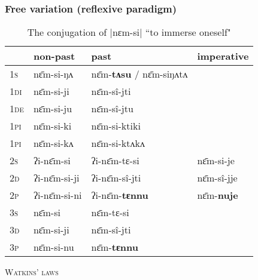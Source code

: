 \documentclass[xcolor=table]{beamer}
\newcommand{\ipa}[1]{{\phon \mbox{#1}}} %
\newcommand{\grise}[1]{\cellcolor{lightgray}\textbf{#1}}
\begin{document}
    
  \begin{frame} 
 \frametitle{Free variation (reflexive paradigm)} 
 

\begin{table}[h]
\caption{The conjugation of |\ipa{nɛm-si}|  ``to immerse oneself"  } \centering \label{tab:nyamsi}
\begin{tabular}{l|l|l|l}  
\toprule
& non-past & past & imperative\\
\midrule
\textsc{1s}  &  \ipa{nɛ̄m-si-ŋʌ}   &  \ipa{nɛ̄m-\textbf{tʌsu}} / \ipa{nɛ̄m-siŋʌtʌ}  \grise{}\\ 
\textsc{1di}  &  \ipa{nɛ̄m-si-ji}   &  \ipa{nɛ̄m-sî-jti} \\
\textsc{1de}  &  \ipa{nɛ̄m-si-ju}   &  \ipa{nɛ̄m-sî-jtu} \\ 
\textsc{1pi}  &  \ipa{nɛ̄m-si-ki}   &  \ipa{nɛ̄m-si-ktiki} \\ 
\textsc{1pi}  &  \ipa{nɛ̄m-si-kʌ}   &  \ipa{nɛ̄m-si-ktʌkʌ} \\ 
\midrule
\textsc{2s}  &  \ipa{ʔi-nɛ̄m-si}   &  \ipa{ʔi-nɛ̄m-tɛ-si}   &  \ipa{nɛ̄m-si-je} \\ 
\textsc{2d}  &  \ipa{ʔi-nɛ̄m-si-ji}   &  \ipa{ʔi-nɛ̄m-sî-jti}   &  \ipa{nɛ̄m-sî-jje} \\
\textsc{2p}  &  \ipa{ʔi-nɛ̄m-si-ni}   &  \ipa{ʔi-nɛ̄m-\textbf{tɛnnu}}   &  \ipa{nɛ̄m-\textbf{nuje}} \\ 
\midrule
\textsc{3s}  &  \ipa{nɛ̄m-si}   &  \ipa{nɛ̄m-tɛ-si} \\ 
\textsc{3d}  &  \ipa{nɛ̄m-si-ji}   &  \ipa{nɛ̄m-sî-jti} \\ 
\textsc{3p}  &  \ipa{nɛ̄m-si-nu}   &  \ipa{nɛ̄m-\textbf{tɛnnu}}   \\ 
\bottomrule
\end{tabular}
\end{table}

\textsc{Watkins' laws}
  \end{frame}   
  
\end{document}
